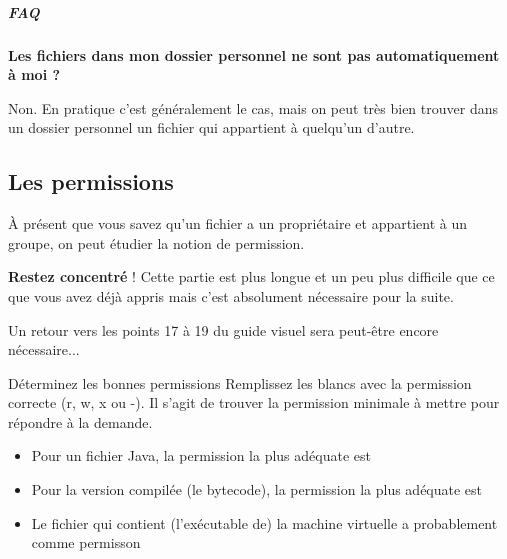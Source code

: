 \documentclass[a4paper,11pt]{article}
\begin{document}
		\subparagraph{FAQ} 

\textbf{Les fichiers dans mon dossier personnel ne sont pas automatiquement \`a moi ?}

Non. En pratique c'est g\'en\'eralement le cas, 
mais on peut tr\`es bien trouver dans un dossier personnel un fichier qui appartient \`a quelqu'un d'autre.  


        \subsection{Les permissions}  
\`A pr\'esent que vous savez qu'un fichier a un propri\'etaire et appartient \`a un groupe, 
on peut \'etudier la notion de permission.    

\textbf{Restez concentr\'e} ! 
Cette partie est plus longue et un peu plus difficile que ce que vous avez d\'ej\`a appris 
mais c'est absolument n\'ecessaire pour la suite.   

Un retour vers les points 17 \`a 19 du guide visuel sera peut-\^etre encore n\'ecessaire...  


\begin{Exercice}{D\'eterminez les bonnes permissions}
	Remplissez les blancs avec la permission correcte (r, w, x ou -). 
	Il s'agit de trouver la permission minimale \`a mettre pour r\'epondre \`a la demande.   
	
	\begin{itemize}
		
		\item 
		Pour un fichier Java, la permission la plus ad\'equate est
		\textcolor{gray}{\underline{\hspace*{1em}}}  \textcolor{gray}{\underline{\hspace*{1em}}}  \textcolor{gray}{\underline{\hspace*{1em}}} 
		\item 
		Pour la version compil\'ee (le bytecode), la permission la plus ad\'equate est
		\textcolor{gray}{\underline{\hspace*{1em}}}  \textcolor{gray}{\underline{\hspace*{1em}}}  \textcolor{gray}{\underline{\hspace*{1em}}} 
		\item 
		Le fichier qui contient (l'ex\'ecutable de) la machine virtuelle a probablement comme permisson
		\textcolor{gray}{\underline{\hspace*{1em}}}  \textcolor{gray}{\underline{\hspace*{1em}}}  \textcolor{gray}{\underline{\hspace*{1em}}} 
	\end{itemize}
	
\end{Exercice}
\end{document}
